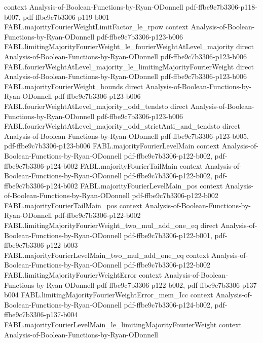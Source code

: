 \begin{theorem}
  {context}
  {Analysis-of-Boolean-Functions-by-Ryan-ODonnell}
  {pdf-ffbe9c7b3306-p118-b007,
    pdf-ffbe9c7b3306-p119-b001}
\proofstep
  {FABL.majorityFourierWeightLimitFactor_le_rpow}
  {context}
  {Analysis-of-Boolean-Functions-by-Ryan-ODonnell}
  {pdf-ffbe9c7b3306-p123-b006}
\proofstep
  {FABL.limitingMajorityFourierWeight_le_fourierWeightAtLevel_majority}
  {direct}
  {Analysis-of-Boolean-Functions-by-Ryan-ODonnell}
  {pdf-ffbe9c7b3306-p123-b006}
\proofstep
  {FABL.fourierWeightAtLevel_majority_le_limitingMajorityFourierWeight}
  {direct}
  {Analysis-of-Boolean-Functions-by-Ryan-ODonnell}
  {pdf-ffbe9c7b3306-p123-b006}
\proofstep
  {FABL.majorityFourierWeight_bounds}
  {direct}
  {Analysis-of-Boolean-Functions-by-Ryan-ODonnell}
  {pdf-ffbe9c7b3306-p123-b006}
\proofstep
  {FABL.fourierWeightAtLevel_majority_odd_tendsto}
  {direct}
  {Analysis-of-Boolean-Functions-by-Ryan-ODonnell}
  {pdf-ffbe9c7b3306-p123-b006}
\proofstep
  {FABL.fourierWeightAtLevel_majority_odd_strictAnti_and_tendsto}
  {direct}
  {Analysis-of-Boolean-Functions-by-Ryan-ODonnell}
  {pdf-ffbe9c7b3306-p123-b005,
    pdf-ffbe9c7b3306-p123-b006}
\proofstep
  {FABL.majorityFourierLevelMain}
  {context}
  {Analysis-of-Boolean-Functions-by-Ryan-ODonnell}
  {pdf-ffbe9c7b3306-p122-b002,
    pdf-ffbe9c7b3306-p124-b002}
\proofstep
  {FABL.majorityFourierTailMain}
  {context}
  {Analysis-of-Boolean-Functions-by-Ryan-ODonnell}
  {pdf-ffbe9c7b3306-p122-b002,
    pdf-ffbe9c7b3306-p124-b002}
\proofstep
  {FABL.majorityFourierLevelMain_pos}
  {context}
  {Analysis-of-Boolean-Functions-by-Ryan-ODonnell}
  {pdf-ffbe9c7b3306-p122-b002}
\proofstep
  {FABL.majorityFourierTailMain_pos}
  {context}
  {Analysis-of-Boolean-Functions-by-Ryan-ODonnell}
  {pdf-ffbe9c7b3306-p122-b002}
\proofstep
  {FABL.limitingMajorityFourierWeight_two_mul_add_one_eq}
  {direct}
  {Analysis-of-Boolean-Functions-by-Ryan-ODonnell}
  {pdf-ffbe9c7b3306-p122-b001,
    pdf-ffbe9c7b3306-p122-b003}
\proofstep
  {FABL.majorityFourierLevelMain_two_mul_add_one_eq}
  {context}
  {Analysis-of-Boolean-Functions-by-Ryan-ODonnell}
  {pdf-ffbe9c7b3306-p122-b002}
\proofstep
  {FABL.limitingMajorityFourierWeightError}
  {context}
  {Analysis-of-Boolean-Functions-by-Ryan-ODonnell}
  {pdf-ffbe9c7b3306-p122-b002,
    pdf-ffbe9c7b3306-p137-b004}
\proofstep
  {FABL.limitingMajorityFourierWeightError_mem_Icc}
  {context}
  {Analysis-of-Boolean-Functions-by-Ryan-ODonnell}
  {pdf-ffbe9c7b3306-p124-b002,
    pdf-ffbe9c7b3306-p137-b004}
\proofstep
  {FABL.majorityFourierLevelMain_le_limitingMajorityFourierWeight}
  {context}
  {Analysis-of-Boolean-Functions-by-Ryan-ODonnell}

\end{theorem}
